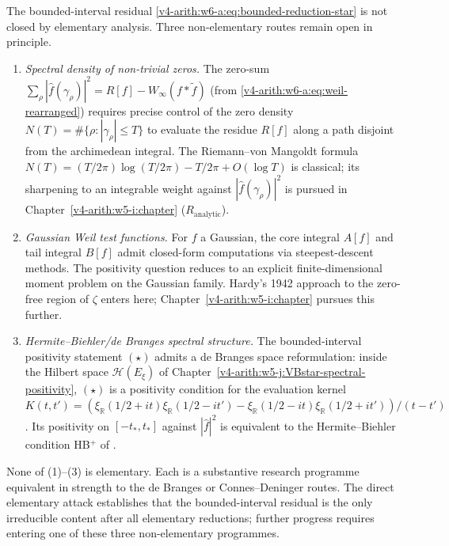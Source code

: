 \begin{remark}
\label{v4-arith:w6-a:rem:live-routes}
The bounded-interval residual
\eqref{v4-arith:w6-a:eq:bounded-reduction-star} is not closed by
elementary analysis. Three non-elementary routes remain open in
principle.

\begin{enumerate}
\item \emph{Spectral density of non-trivial zeros.} The zero-sum
\(\sum_{\rho}|\widehat{f}(\gamma_{\rho})|^{2}=R[f]-W_{\infty}(f*\widetilde{f})\)
(from \eqref{v4-arith:w6-a:eq:weil-rearranged}) requires precise
control of the zero density \(N(T)=\#\{\rho:|\gamma_{\rho}|\leq T\}\)
to evaluate the residue \(R[f]\) along a path disjoint from the
archimedean integral. The Riemann--von Mangoldt formula
\(N(T)=(T/2\pi)\log(T/2\pi)-T/2\pi+O(\log T)\) is classical; its
sharpening to an integrable weight against
\(|\widehat{f}(\gamma_{\rho})|^{2}\) is pursued in
Chapter~\ref{v4-arith:w5-i:chapter}
(\(R_{\mathrm{analytic}}\)).
\item \emph{Gaussian Weil test functions.} For \(f\) a Gaussian, the
core integral \(A[f]\) and tail integral \(B[f]\) admit closed-form
computations via steepest-descent methods. The positivity question
reduces to an explicit finite-dimensional moment problem on the
Gaussian family. Hardy's 1942 approach to the zero-free region of
\(\zeta\) enters here; Chapter~\ref{v4-arith:w5-i:chapter} pursues
this further.
\item \emph{Hermite--Biehler/de Branges spectral structure.}
The bounded-interval positivity statement \((\star)\) admits a de
Branges space reformulation: inside the Hilbert space
\(\mathcal{H}(E_{\xi})\) of
Chapter~\ref{v4-arith:w5-j:VBstar-spectral-positivity}, \((\star)\)
is a positivity condition for the evaluation kernel
\(K(t,t')=(\xi_{\mathbb{R}}(1/2+it)\xi_{\mathbb{R}}(1/2-it')-\xi_{\mathbb{R}}(1/2-it)\xi_{\mathbb{R}}(1/2+it'))/(t-t')\).
Its positivity on \([-t_{\ast},t_{\ast}]\) against
\(|\widehat{f}|^{2}\) is equivalent to the Hermite--Biehler
condition HB\(^{+}\) of
.
\end{enumerate}

None of (1)--(3) is elementary. Each is a substantive research
programme equivalent in strength to the de Branges or
Connes--Deninger routes. The direct elementary attack establishes
that the bounded-interval residual is the only irreducible content
after all elementary reductions; further progress requires entering
one of these three non-elementary programmes.
\end{remark}

